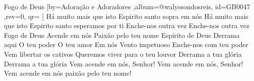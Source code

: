 \beginsong
{Fogo de Deus %
}[by={Adoração e Adoradores %
},album={@walyssondosreis},
id={GB0047 %
},rev={0}, %
qr={ %
}]
\beginverse*
Há muito mais que isto
Espirito santo sopra em nós
Há muito mais que isto
Espirito santo esperamos por ti
\endverse
\beginverse*
Enche-nos outra vez
Enche-nos outra vez
\endverse
\beginchorus
Fogo de Deus
Acende em nós
Paixão pelo teu nome
Espirito de Deus
Derrama aqui
O teu poder
O teu amor
Em nós
\endchorus
\beginverse*
Vento impetuoso
Enche-nos com teu poder
Vem libertar os cativos
Queremos viver para o teu louvor
Derrama a tua glória
Derrama a tua glória
\endverse
\beginverse*
Vem acende em nós, Senhor!
Vem acende em nós, Senhor!
Vem acende em nós paixão pelo teu nome!
\endverse


